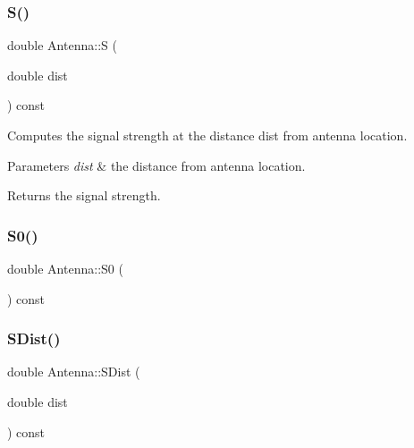\mbox{\label{class_antenna_a5715c4100035c58d63b7c9a0195748fe}} 
\subsubsection{\texorpdfstring{S()}{S()}}
{\footnotesize\ttfamily double Antenna\+::S (\begin{DoxyParamCaption}\item[{double}]{dist }\end{DoxyParamCaption}) const\hspace{0.3cm}{\ttfamily [private]}}

Computes the signal strength at the distance dist from antenna location. 
\begin{DoxyParams}{Parameters}
{\em dist} & the distance from antenna location. \\
\hline
\end{DoxyParams}
\begin{DoxyReturn}{Returns}
the signal strength. 
\end{DoxyReturn}
\mbox{\label{class_antenna_a033246c50bec80123860154a949620c7}} 
\subsubsection{\texorpdfstring{S0()}{S0()}}
{\footnotesize\ttfamily double Antenna\+::\+S0 (\begin{DoxyParamCaption}{ }\end{DoxyParamCaption}) const\hspace{0.3cm}{\ttfamily [private]}}

\mbox{\label{class_antenna_ae60ab40ded94be407c3b7455f4e886fe}} 
\subsubsection{\texorpdfstring{S\+Dist()}{SDist()}}
{\footnotesize\ttfamily double Antenna\+::\+S\+Dist (\begin{DoxyParamCaption}\item[{double}]{dist }\end{DoxyParamCaption}) const\hspace{0.3cm}{\ttfamily [private]}}

